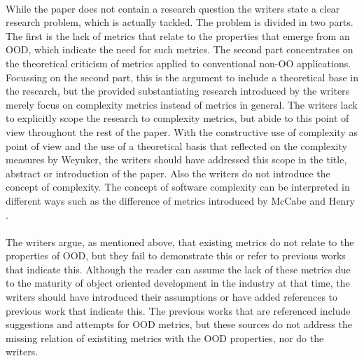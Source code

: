 \paragraph{}
While the paper does not contain a research question the writers state a clear research problem, which is actually tackled.
The problem is divided in two parts. The first is the lack of metrics that relate to the properties that emerge from an
OOD, which indicate the need for such metrics. The second part concentrates on the theoretical criticism of metrics
applied to conventional non-OO applications. Focussing on the second part, this is the argument to include a theoretical base in the
research, but the provided substantiating research introduced by the writers merely focus on complexity metrics instead
of metrics in general. The writers lack to explicitly scope the research to complexity metrics, but abide to this
point of view throughout the rest of the paper. With the constructive use of complexity as point of view and the use of
a theoretical basis that reflected on the complexity measures by Weyuker, the writers should have addressed this scope in
the title, abstract or introduction of the paper. Also the writers do not introduce the concept of complexity. The concept of
software complexity can be interpreted in different ways such as the difference of metrics introduced by McCabe \autocite{ICSE-1976-McCabe}
and Henry \autocite{HENRY}.

\paragraph{}
The writers argue, as mentioned above, that existing metrics do not relate to the properties of OOD, but they fail
to demonstrate this or refer to previous works that indicate this. Although the reader can assume the lack of these
metrics due to the maturity of object oriented development in the industry at that time, the writers should have introduced
their assumptions or have added references to previous work that indicate this. The previous works that are referenced include suggestions
and attempts for OOD metrics, but these sources do not address the missing relation of existiting metrics with the OOD
properties, nor do the writers.

